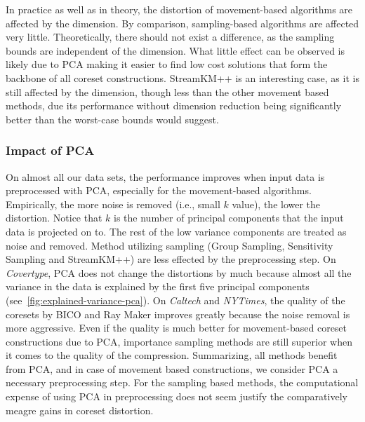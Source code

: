 In practice as well as in theory, the distortion of movement-based algorithms are affected by the dimension. By comparison, sampling-based algorithms are affected very little. Theoretically, there should not exist a difference, as the sampling bounds are independent of the dimension. What little effect can be observed is likely due to PCA making it easier to find low cost solutions that form the backbone of all coreset constructions. StreamKM++ is an interesting case, as it is still affected by the dimension, though less than the other movement based methods, due its performance without dimension reduction being significantly better than the worst-case bounds would suggest. 





\subsubsection*{Impact of PCA}

On almost all our data sets, the performance improves when input data is preprocessed with PCA, especially for the movement-based algorithms. Empirically, the more noise is removed (i.e., small $k$ value), the lower the distortion. Notice that $k$ is the number of principal components that the input data is projected on to. The rest of the low variance components are treated as noise and removed. Method utilizing sampling (Group Sampling, Sensitivity Sampling and StreamKM++) are less effected by the preprocessing step. On \textit{Covertype}, PCA does not change the distortions by much because almost all the variance in the data is explained by the first five principal components (see~\cref{fig:explained-variance-pca}). 
On \textit{Caltech} and \textit{NYTimes}, the quality of the coresets by BICO and Ray Maker improves greatly because the noise removal is more aggressive. Even if the quality is much better for movement-based coreset constructions due to PCA, importance sampling methods are still superior when it comes to the quality of the compression. Summarizing, all methods benefit from PCA, and in case of movement based constructions, we consider PCA a necessary preprocessing step. For the sampling based methods, the computational expense of using PCA in preprocessing does not seem justify the comparatively meagre gains in coreset distortion.


